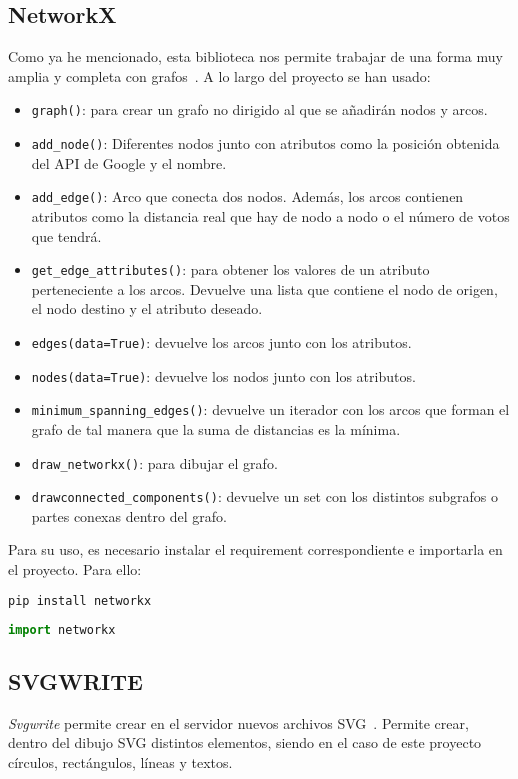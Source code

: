 \subsection{NetworkX}\label{networkx}
Como ya he mencionado, esta biblioteca nos permite trabajar de una forma muy amplia y completa con grafos~\cite{doc:networkx}. A lo largo del proyecto se han usado:
\begin{itemize}
	\item \texttt{graph()}: para crear un grafo no dirigido al que se añadirán nodos y arcos.
	\item \texttt{add\_node()}: Diferentes nodos junto con atributos como la posición obtenida del API de Google y el nombre.
	\item \texttt{add\_edge()}: Arco que conecta dos nodos. Además, los arcos contienen atributos como la distancia real que hay de nodo a nodo o el número de votos que tendrá.
	\item \texttt{get\_edge\_attributes()}: para obtener los valores de un atributo perteneciente a los arcos. Devuelve una lista que contiene el nodo de origen, el nodo destino y el atributo deseado.
	\item \texttt{edges(data=True)}: devuelve los arcos junto con los atributos.
	\item \texttt{nodes(data=True)}: devuelve los nodos junto con los atributos.
	\item \texttt{minimum\_spanning\_edges()}: devuelve un iterador con los arcos que forman el grafo de tal manera que la suma de distancias es la mínima.
	\item \texttt{draw\_networkx()}: para dibujar el grafo.
	\item \texttt{drawconnected\_components()}: devuelve un set con los distintos subgrafos o partes conexas dentro del grafo.
\end{itemize}

Para su uso, es necesario instalar el requirement correspondiente e importarla en el proyecto. Para ello:
\renewcommand{\lstlistingname}{NetworkX}
\renewcommand{\lstlistlistingname}{List of \lstlistingname s}
\begin{lstlisting}[language=python,caption={Instalación mediante pip.}]
pip install networkx
\end{lstlisting}
\begin{lstlisting}[language=python,caption={Importación.}]
import networkx
\end{lstlisting}

\subsection{SVGWRITE}\label{svgwrite}
\textit{Svgwrite} permite crear en el servidor nuevos archivos SVG~\cite{doc:svgwritedocs}. Permite crear, dentro del dibujo SVG distintos elementos, siendo en el caso de este proyecto círculos, rectángulos, líneas y textos. 

